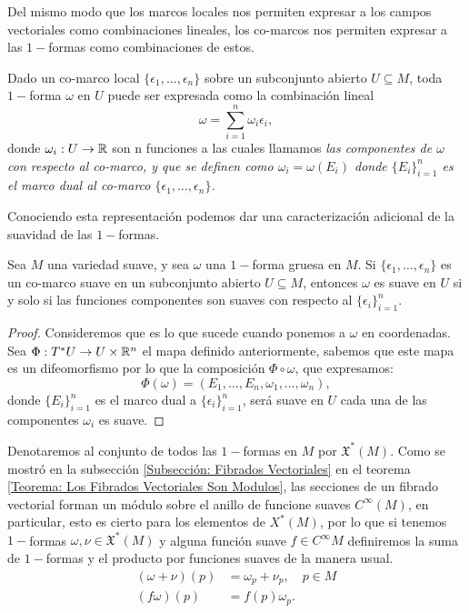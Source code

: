Del mismo modo que los marcos locales nos permiten expresar a los campos vectoriales como combinaciones lineales, los co-marcos nos permiten expresar a las $1-$formas como combinaciones de estos.

Dado un co-marco local $\{\epsilon_1,\ldots,\epsilon_n\}$ sobre un subconjunto abierto $U \subseteq M$, toda $1-$forma $\omega$ en $U$ puede ser expresada como la combinación lineal
\[
	\omega = \sum_{i=1}^{n} \omega_i \epsilon_i,
\]
donde $\omega_i: U \to \mathbb{R}$ son n funciones a las cuales llamamos \it{las componentes de $\omega$ con respecto al co-marco}, y que se definen como $\omega_i = \omega(E_i)$ donde $\{E_i\}_{i=1}^n$ es el marco dual al co-marco $\{\epsilon_1,\ldots,\epsilon_n\}$.

Conociendo esta representación podemos dar una caracterización adicional de la suavidad de las $1-$formas.

\begin{theorem}
	Sea $M$ una variedad suave, y sea $\omega$ una $1-$forma gruesa en $M$. Si $\{\epsilon_1,\ldots,\epsilon_n\}$ es un co-marco suave en un subconjunto abierto $U \subseteq M$, entonces $\omega$ es suave en $U$ si y solo si las funciones componentes son suaves con respecto al $\{\epsilon_i\}_{i=1}^n$.
\end{theorem}

\begin{proof}
	Consideremos que es lo que sucede cuando ponemos a $\omega$ en coordenadas. Sea $\Phi: T^{*}U \to U \times \mathbb{R}^n$ el mapa definido anteriormente, sabemos que este mapa es un difeomorfismo por lo que la composición $\Phi \circ \omega$, que expresamos:
	\[
		\Phi(\omega) = (E_1, \ldots, E_n, \omega_1, \ldots, \omega_n),
	\]
	donde $\{E_i\}_{i=1}^n$ es el marco dual a $\{\epsilon_i\}_{i=1}^n$, será suave en $U$ cada una de las componentes $\omega_i$ es suave.
\end{proof}

Denotaremos al conjunto de todos las $1-$formas en $M$ por $\mathfrak{X}^*(M)$. Como se mostró en la subsección \ref{Subsección: Fibrados Vectoriales} en el teorema \ref{Teorema: Los Fibrados Vectoriales Son Modulos}, las secciones de un fibrado vectorial forman un módulo sobre el anillo de funcione suaves $C^{\infty}(M)$, en particular, esto es cierto para los elementos de $X^{*}(M)$, por lo que si tenemos $1-$formas $\omega,\nu \in \mathfrak{X}^*(M)$ y alguna función suave $f \in C^{\infty}M$ definiremos la suma de $1-$formas y el producto por funciones suaves de la manera usual.
\begin{align*}
	(\omega + \nu)(p) & = \omega_p + \nu_p, \quad p \in M \\
	(f\omega)(p)      & = f(p)\omega_p.
\end{align*}
